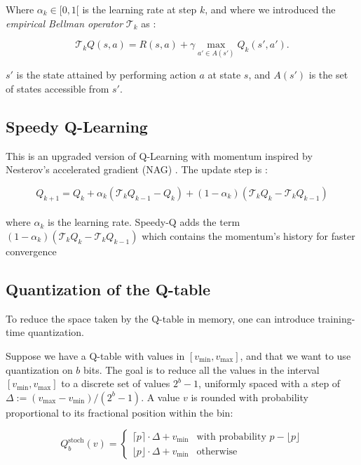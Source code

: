 \documentclass[10pt,conference,compsocconf]{IEEEtran}
\begin{document}
        Where $\alpha_k \in [0, 1[$ is the learning rate at step $k$, and where we introduced the \textit{empirical Bellman operator} $\mathcal{T}_k$ as :
        
        \begin{equation}
         \mathcal{T}_k Q(s, a) = R(s, a) + \gamma \max_{a' \in A(s')} Q_k (s', a').
        \end{equation}
        
        $s'$ is the state attained by performing action $a$ at state $s$, and $A(s')$ is the set of states accessible from $s'$.

        
    \subsection{Speedy Q-Learning}

        This is an upgraded version of Q-Learning with momentum inspired by Nesterov’s accelerated gradient (NAG) \cite{nesterov1983method}. The update step is :

        \begin{equation}
        Q_{k+1} = Q_k + \alpha_k(\mathcal{T}_k Q_{k-1} - Q_k) + (1-\alpha_k)(\mathcal{T}_k Q_k - \mathcal{T}_k Q_{k-1})
        \label{eq:speedy_q_equation}
        \end{equation}\\
        where $\alpha_k$ is the learning rate. Speedy-Q adds the term $(1-\alpha_k)(\mathcal{T}_k Q_k - \mathcal{T}_k Q_{k-1})$ which contains the momentum's history for faster convergence
        
    
    \subsection{Quantization of the Q-table}

        To reduce the space taken by the Q-table in memory, one can introduce training-time quantization.

    Suppose we have a Q-table with values in $[v_\text{min}, v_\text{max}]$, and that we want to use quantization on $b$ bits. The goal is to reduce all the values in the interval $[v_\text{min}, v_\text{max}]$ to a discrete set of values $2^b - 1$, uniformly spaced with a step of $\Delta := (v_{\max} - v_{\min})/(2^b - 1)$. A value $v$ is rounded with probability proportional to its fractional position within the bin:
        
        \begin{equation}
            Q_b^{\text{stoch}}(v) =
            \begin{cases}
                \lceil p \rceil \cdot \Delta + v_{\min}
                    & \text{with probability } p - \lfloor p \rfloor \\
                \lfloor p \rfloor \cdot \Delta + v_{\min}
                    & \text{otherwise}
            \end{cases}
        \end{equation}\\
        
\end{document}
